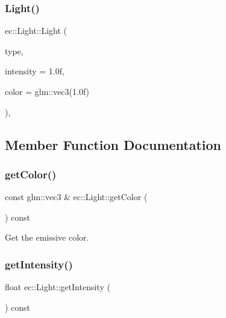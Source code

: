 \mbox{\label{classec_1_1_light_a7816fc3b8f92cd0ac732be6944754995}} 
\subsubsection{\texorpdfstring{Light()}{Light()}}
{\footnotesize\ttfamily ec\+::\+Light\+::\+Light (\begin{DoxyParamCaption}\item[{\mbox{\hyperlink{namespaceec_a30e2a743ebdeb02ac68a6cfa50f629c7}{Light\+Type}}}]{type,  }\item[{float}]{intensity = {\ttfamily 1.0f},  }\item[{const glm\+::vec3 \&}]{color = {\ttfamily glm\+:\+:vec3(1.0f)} }\end{DoxyParamCaption})\hspace{0.3cm}{\ttfamily [explicit]}, {\ttfamily [protected]}}



\subsection{Member Function Documentation}
\mbox{\label{classec_1_1_light_a3eaa8c20fc0d48588078bd82f13fbaef}} 
\subsubsection{\texorpdfstring{get\+Color()}{getColor()}}
{\footnotesize\ttfamily const glm\+::vec3 \& ec\+::\+Light\+::get\+Color (\begin{DoxyParamCaption}{ }\end{DoxyParamCaption}) const}

Get the emissive color. \mbox{\label{classec_1_1_light_a8380a3371b458030258bcf7a39857e17}} 
\subsubsection{\texorpdfstring{get\+Intensity()}{getIntensity()}}
{\footnotesize\ttfamily float ec\+::\+Light\+::get\+Intensity (\begin{DoxyParamCaption}{ }\end{DoxyParamCaption}) const}

